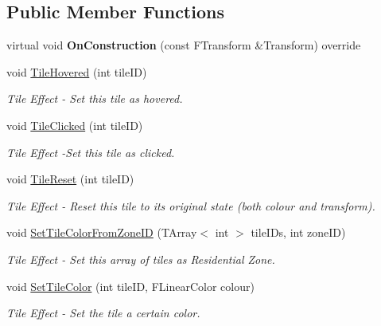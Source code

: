 \subsection*{Public Member Functions}
\begin{DoxyCompactItemize}
\item 
\mbox{\label{class_a_t_t___grid_manager_a1866eb17b7f52718ed61ff5664453f8a}} 
virtual void {\bfseries On\+Construction} (const F\+Transform \&Transform) override
\item 
void \mbox{\hyperlink{class_a_t_t___grid_manager_ae67df470fb8fde84f2fd67b3799a04d8}{Tile\+Hovered}} (int tile\+ID)
\begin{DoxyCompactList}\small\item\em Tile Effect -\/ Set this tile as hovered. \end{DoxyCompactList}\item 
void \mbox{\hyperlink{class_a_t_t___grid_manager_a6f460da9a1912ed31e2e5c9959b447ce}{Tile\+Clicked}} (int tile\+ID)
\begin{DoxyCompactList}\small\item\em Tile Effect -\/Set this tile as clicked. \end{DoxyCompactList}\item 
void \mbox{\hyperlink{class_a_t_t___grid_manager_a7ff2d0e2f13412c3d0aba2393f9f7e5f}{Tile\+Reset}} (int tile\+ID)
\begin{DoxyCompactList}\small\item\em Tile Effect -\/ Reset this tile to its original state (both colour and transform). \end{DoxyCompactList}\item 
void \mbox{\hyperlink{class_a_t_t___grid_manager_acdaeb76af04a73d65ea6c249b3bace21}{Set\+Tile\+Color\+From\+Zone\+ID}} (T\+Array$<$ int $>$ tile\+I\+Ds, int zone\+ID)
\begin{DoxyCompactList}\small\item\em Tile Effect -\/ Set this array of tiles as Residential Zone. \end{DoxyCompactList}\item 
void \mbox{\hyperlink{class_a_t_t___grid_manager_a6e53d6048a017a5b3b799a001103ed04}{Set\+Tile\+Color}} (int tile\+ID, F\+Linear\+Color colour)
\begin{DoxyCompactList}\small\item\em Tile Effect -\/ Set the tile a certain color. \end{DoxyCompactList}\item 

\end{DoxyCompactItemize}
